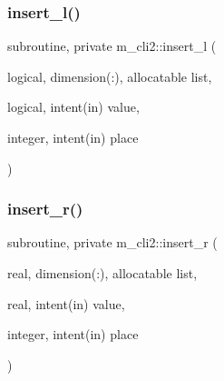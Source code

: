 \subsubsection{\texorpdfstring{insert\+\_\+l()}{insert\_l()}}
{\footnotesize\ttfamily subroutine, private m\+\_\+cli2\+::insert\+\_\+l (\begin{DoxyParamCaption}\item[{logical, dimension(\+:), allocatable}]{list,  }\item[{logical, intent(in)}]{value,  }\item[{integer, intent(in)}]{place }\end{DoxyParamCaption})\hspace{0.3cm}{\ttfamily [private]}}

\mbox{\label{namespacem__cli2_ae43e655d3678fcc31824a3e9db3daae1}} 
\subsubsection{\texorpdfstring{insert\+\_\+r()}{insert\_r()}}
{\footnotesize\ttfamily subroutine, private m\+\_\+cli2\+::insert\+\_\+r (\begin{DoxyParamCaption}\item[{real, dimension(\+:), allocatable}]{list,  }\item[{real, intent(in)}]{value,  }\item[{integer, intent(in)}]{place }\end{DoxyParamCaption})\hspace{0.3cm}{\ttfamily [private]}}

\mbox{\label{namespacem__cli2_a4c12c311327951984c6e1611da23cdfd}} 
